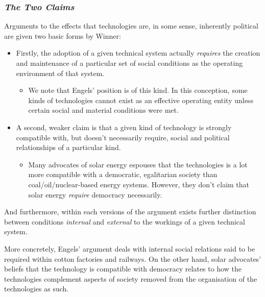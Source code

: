 \documentclass[openany]{book}
\begin{document}
\subsubsection{\textit{The Two Claims}}
Arguments to the effects that technologies are, in some sense, inherently political are given two basic forms by Winner:
\begin{itemize}
	\item Firstly, the adoption of a given technical system actually \textit{requires} the creation and maintenance of a particular set of social conditions as the operating environment of that system.
	\begin{itemize}
		\item We note that Engels' position is of this kind. In this conception, some kinds of technologies cannot exist as an effective operating entity unless certain social and material conditions were met.
	\end{itemize}
	\item A second, weaker claim is that a given kind of technology is strongly compatible with, but doesn't necessarily require, social and political relationships of a particular kind.
	\begin{itemize}
		\item Many advocates of solar energy espouses that the technologies is a lot more compatible with a democratic, egalitarian society than coal/oil/nuclear-based energy systems. However, they don't claim that solar energy \textit{require} democracy necessarily.
	\end{itemize}
\end{itemize}

And furthermore, within each versions of the argument exists further distinction between conditions \textit{internal} and \textit{external} to the workings of a given technical system.

More concretely, Engels' argument deals with internal social relations said to be required within cotton factories and railways. On the other hand, solar advocates' beliefs that the technology is compatible with democracy relates to how the technologies complement aspects of society removed from the organisation of the technologies as such.
\end{document}
